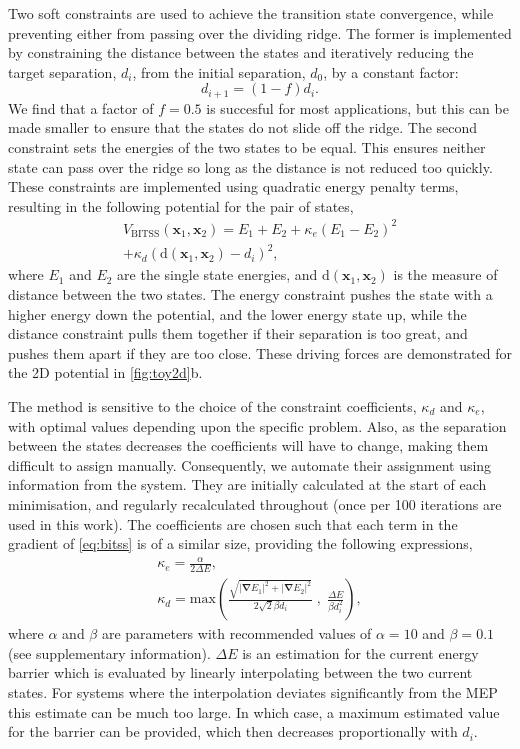 \documentclass[aps,twocolumn]{revtex4-1}
\begin{document}
\topic Two soft constraints are used to achieve the transition state convergence, while preventing either from passing over the dividing ridge.
The former is implemented by constraining the distance between the states and iteratively reducing the target separation, $d_i$, from the initial separation, $d_0$, by a constant factor:
\begin{equation}
  d_{i+1} = (1 - f) d_i.
  \label{eq:diteration}
\end{equation}
We find that a factor of $f = 0.5$ is succesful for most applications, but this can be made smaller to ensure that the states do not slide off the ridge.
The second constraint sets the energies of the two states to be equal.
This ensures neither state can pass over the ridge so long as the distance is not reduced too quickly.
These constraints are implemented using quadratic energy penalty terms, resulting in the following potential for the pair of states,
\begin{multline}
  V_\text{BITSS}(\bm{x}_1, \bm{x}_2) = E_1 + E_2
    + \kappa_e \left( E_1 - E_2 \right) ^2 \\
    + \kappa_d \left( \mathrm{d}(\bm{x}_1, \bm{x}_2) - d_i \right) ^2,
  \label{eq:bitss}
\end{multline}
where $E_1$ and $E_2$ are the single state energies, and $\mathrm{d}(\bm{x}_1, \bm{x}_2)$ is the measure of distance between the two states.
The energy constraint pushes the state with a higher energy down the potential, and the lower energy state up, while the distance constraint pulls them together if their separation is too great, and pushes them apart if they are too close.
These driving forces are demonstrated for the 2D potential in \cref{fig:toy2d}b.

\topic The method is sensitive to the choice of the constraint coefficients, $\kappa_d$ and $\kappa_e$, with optimal values depending upon the specific problem.
Also, as the separation between the states decreases the coefficients will have to change, making them difficult to assign manually.
Consequently, we automate their assignment using information from the system.
They are initially calculated at the start of each minimisation, and regularly recalculated throughout (once per 100 iterations are used in this work).
The coefficients are chosen such that each term in the gradient of \cref{eq:bitss} is of a similar size, providing the following expressions,
\begin{gather}
  \kappa_e = \frac {\alpha} {2 \Delta E},
  \label{eq:ke}
  \\
  \kappa_d = \text{max} \left(
    \frac {\sqrt{|\bm{\nabla} E_1|^2 + |\bm{\nabla} E_2|^2}} {2\sqrt{2} \beta d_i} \; , \;
    \frac{\Delta E}{\beta d_i^2} \right),
  \label{eq:kd}
\end{gather}
where $\alpha$ and $\beta$ are parameters with recommended values of $\alpha = 10$ and $\beta = 0.1$ (see supplementary information).
$\Delta E$ is an estimation for the current energy barrier which is evaluated by linearly interpolating between the two current states.
For systems where the interpolation deviates significantly from the MEP this estimate can be much too large.
In which case, a maximum estimated value for the barrier can be provided, which then decreases proportionally with $d_i$.
\end{document}
